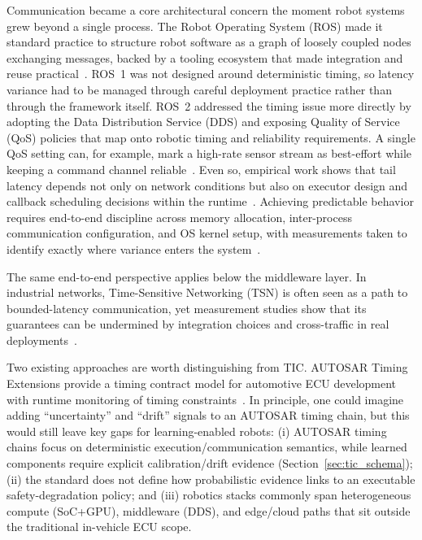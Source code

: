 \documentclass[smallextended]{svjour3}
\begin{document}
Communication became a core architectural concern the moment robot systems grew beyond a single process. The Robot Operating System (ROS) made it standard practice to structure robot software as a graph of loosely coupled nodes exchanging messages, backed by a tooling ecosystem that made integration and reuse practical~\cite{quigley2009}.
ROS~1 was not designed around deterministic timing, so latency variance had to be managed through careful deployment practice rather than through the framework itself. ROS~2 addressed the timing issue more directly by adopting the Data Distribution Service (DDS) and exposing Quality of Service (QoS) policies that map onto robotic timing and reliability requirements. A single QoS setting can, for example, mark a high-rate sensor stream as best-effort while keeping a command channel reliable~\cite{maruyama2016}. Even so, empirical work shows that tail latency depends not only on network conditions but also on executor design and callback scheduling decisions within the runtime~\cite{kronauer2021,casini2019}.
Achieving predictable behavior requires end-to-end discipline across memory allocation, inter-process communication configuration, and OS kernel setup, with measurements taken to identify exactly where variance enters the system~\cite{ros2realtime2023,ros2executor2024}.

The same end-to-end perspective applies below the middleware layer. In industrial networks, Time-Sensitive Networking (TSN) is often seen as a path to bounded-latency communication, yet measurement studies show that its guarantees can be undermined by integration choices and cross-traffic in real deployments~\cite{wfcs2023tsn}.

Two existing approaches are worth distinguishing from {TIC}. {AUTOSAR} Timing Extensions provide a timing contract model for automotive {ECU} development with runtime monitoring of timing constraints~\cite{autosar2020}. In principle, one could imagine adding ``uncertainty'' and ``drift'' signals to an {AUTOSAR} timing chain, but this would still leave key gaps for learning-enabled robots: (i) {AUTOSAR} timing chains focus on deterministic execution/communication semantics, while learned components require explicit calibration/drift evidence (Section~\ref{sec:tic_schema}); (ii) the standard does not define how probabilistic evidence links to an executable safety-degradation policy; and (iii) robotics stacks commonly span heterogeneous compute (SoC+GPU), middleware (DDS), and edge/cloud paths that sit outside the traditional in-vehicle ECU scope.
\end{document}

